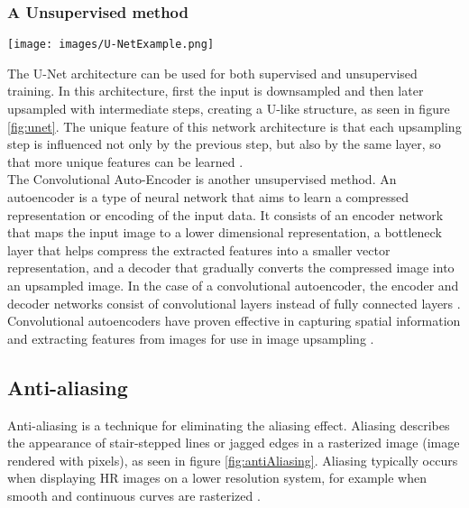 \documentclass[letterpaper, 10 pt, conference]{ieeeconf}  %
\begin{document}
\subsubsection{A Unsupervised method}
\begin{figure*}[!ht]
    \caption{An example of a UNet network architecture. 
    The input gets downsampled with intermediate steps and then again upsampled, forming a U-like structure.}
    \centering
    \texttt{[image: images/U-NetExample.png]}
    \label{fig:unet}
\end{figure*}
The U-Net architecture can be used for both supervised and unsupervised training. 
In this architecture, first the input is downsampled and then later upsampled with intermediate steps, creating a U-like structure, as seen in figure \ref{fig:unet}.
The unique feature of this network architecture is that each upsampling step is influenced not only by the previous step, but also by the same layer, so that more unique features can be learned \cite{Sharma2022ADL}. \\
The Convolutional Auto-Encoder is another unsupervised method. 
An autoencoder is a type of neural network that aims to learn a compressed representation or encoding of the input data.
It consists of an encoder network that maps the input image to a lower dimensional representation, 
a bottleneck layer that helps compress the extracted features into a smaller vector representation, 
and a decoder that gradually converts the compressed image into an upsampled image.
In the case of a convolutional autoencoder, the encoder and decoder networks consist of convolutional layers instead of fully connected layers \cite{conv_autoE}.
Convolutional autoencoders have proven effective in capturing spatial information and extracting features from images for use in image upsampling \cite{liu2021variational}.

\subsection{Anti-aliasing}

Anti-aliasing is a technique for eliminating the aliasing effect. 
Aliasing describes the appearance of stair-stepped lines or jagged edges in a rasterized image (image rendered with pixels), as seen in figure \ref{fig:antiAliasing}.
Aliasing typically occurs when displaying HR images on a lower resolution system, for example when smooth and continuous curves are rasterized \cite{antialiasing_def}.
\end{document}
